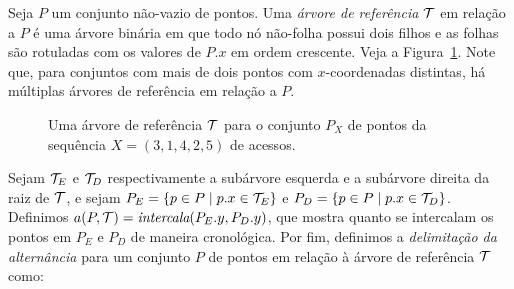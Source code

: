 Seja $P$ um conjunto não-vazio de pontos. Uma \textit{árvore de referência} $\mathcal{T}$ em relação a $P$ é uma árvore binária em que todo nó não-folha possui dois filhos e as folhas são rotuladas com os valores de $P$\hspace{-0.05cm}$.x$ em ordem crescente. Veja a Figura~\ref{fig:arvore_de_referencia_exemplo_inicial}. Note que, para conjuntos com mais de dois pontos com $x$-coordenadas distintas, há múltiplas árvores de referência em relação a $P$.
\begin{figure}
    \caption{Uma árvore de referência $\mathcal{T}$ para o conjunto $P_X$ de pontos da sequência $X = (3,1,4,2,5)$ de acessos.}
\label{fig:arvore_de_referencia_exemplo_inicial}
\end{figure}

Sejam $\mathcal{T}_{E}$ e $\mathcal{T}_{D}$ respectivamente a subárvore esquerda e a subárvore direita da raiz de $\mathcal{T}$, e sejam $P_E = \{p \in P \mid p.x \in \mathcal{T}_E\}$ e $P_D = \{p \in P \mid p.x \in \mathcal{T}_D\}$. Definimos $a(P,\mathcal{T}) = \emph{intercala}(P_E.y, P_D.y)$, que mostra quanto se intercalam os pontos em $P_E$ e $P_D$ de maneira cronológica. Por fim, definimos a \textit{delimitação da alternância} para um conjunto $P$ de pontos em relação à árvore de referência $\mathcal{T}$ como:

